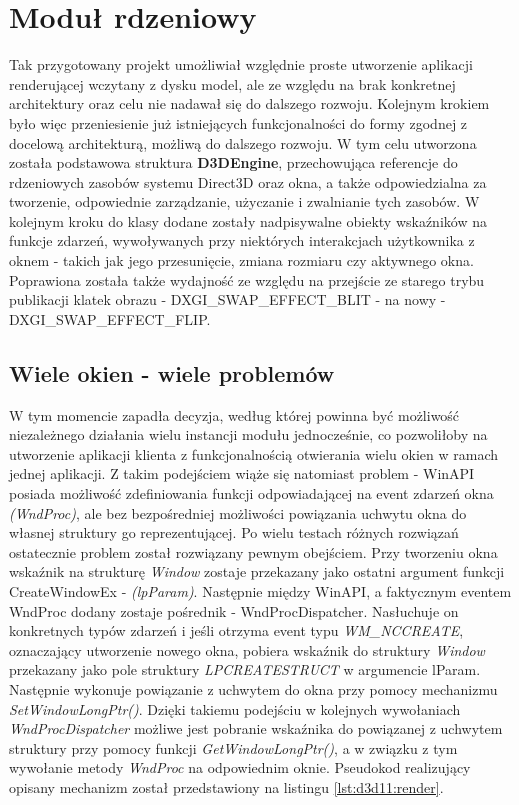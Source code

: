 \section{Moduł rdzeniowy}
Tak przygotowany projekt umożliwiał względnie proste utworzenie aplikacji renderującej wczytany z dysku model, ale ze względu na brak konkretnej architektury oraz celu nie nadawał się do dalszego rozwoju. Kolejnym krokiem było więc przeniesienie już istniejących funkcjonalności do formy zgodnej z docelową architekturą, możliwą do dalszego rozwoju. W tym celu utworzona została podstawowa struktura \textbf{D3DEngine}, przechowująca referencje do rdzeniowych zasobów systemu Direct3D oraz okna, a także odpowiedzialna za tworzenie, odpowiednie zarządzanie, użyczanie i zwalnianie tych zasobów. W kolejnym kroku do klasy dodane zostały nadpisywalne obiekty wskaźników na funkcje zdarzeń, wywoływanych przy niektórych interakcjach użytkownika z oknem - takich jak jego przesunięcie, zmiana rozmiaru czy aktywnego okna. Poprawiona została także wydajność ze względu na przejście ze starego trybu publikacji klatek obrazu - DXGI\_SWAP\_EFFECT\_BLIT - na nowy - DXGI\_SWAP\_EFFECT\_FLIP.

\subsection{Wiele okien - wiele problemów}
W tym momencie zapadła decyzja, według której powinna być możliwość niezależnego działania wielu instancji modułu jednocześnie, co pozwoliłoby na utworzenie aplikacji klienta z funkcjonalnością otwierania wielu okien w ramach jednej aplikacji. Z takim podejściem wiąże się natomiast problem - WinAPI posiada możliwość zdefiniowania funkcji odpowiadającej na event zdarzeń okna \textit{(WndProc)}, ale bez bezpośredniej możliwości powiązania uchwytu okna do własnej struktury go reprezentującej. Po wielu testach różnych rozwiązań ostatecznie problem został rozwiązany pewnym obejściem. Przy tworzeniu okna wskaźnik na strukturę \textit{Window} zostaje przekazany jako ostatni argument funkcji CreateWindowEx - \textit{(lpParam)}. Następnie między WinAPI, a faktycznym eventem WndProc dodany zostaje pośrednik - WndProcDispatcher. Nasłuchuje on konkretnych typów zdarzeń i jeśli otrzyma event typu \textit{WM\_NCCREATE}, oznaczający utworzenie nowego okna, pobiera wskaźnik do struktury \textit{Window} przekazany jako pole struktury \textit{LPCREATESTRUCT} w argumencie lParam. Następnie wykonuje powiązanie z uchwytem do okna przy pomocy mechanizmu \textit{SetWindowLongPtr()}. Dzięki takiemu podejściu w kolejnych wywołaniach \textit{WndProcDispatcher} możliwe jest pobranie wskaźnika do powiązanej z uchwytem struktury przy pomocy funkcji \textit{GetWindowLongPtr()}, a w związku z tym wywołanie metody \textit{WndProc} na odpowiednim oknie. Pseudokod realizujący opisany mechanizm został przedstawiony na listingu \ref{lst:d3d11:render}.

